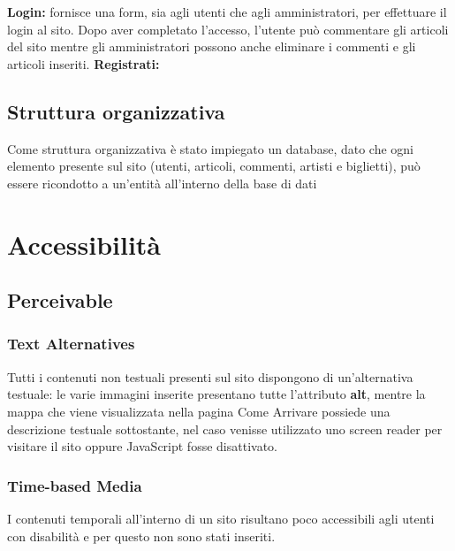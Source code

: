 \documentclass[10pt, a4paper]{article}
\begin{document}
\newline \textbf{Login: }fornisce una form, sia agli utenti che agli amministratori, per effettuare il login al sito. Dopo aver completato l'accesso, l'utente può commentare gli articoli del sito mentre gli amministratori possono anche eliminare i commenti e gli articoli inseriti.
\newline \textbf{Registrati: }
\subsection{Struttura organizzativa}
Come struttura organizzativa è stato impiegato un database, dato che ogni elemento presente sul sito (utenti, articoli, commenti, artisti e biglietti), può essere ricondotto a un'entità all'interno della base di dati
\section{Accessibilità}

\subsection{Perceivable}

\subsubsection{Text Alternatives}
Tutti i contenuti non testuali presenti sul sito dispongono di un'alternativa testuale: le varie immagini inserite presentano tutte l'attributo \textbf{alt}, mentre la mappa che viene visualizzata nella pagina Come Arrivare possiede una descrizione testuale sottostante, nel caso venisse utilizzato uno screen reader per visitare il sito oppure JavaScript fosse disattivato.

\subsubsection{Time-based Media}
I contenuti temporali all'interno di un sito risultano poco accessibili agli utenti con disabilità e per questo non sono stati inseriti.
\end{document}
